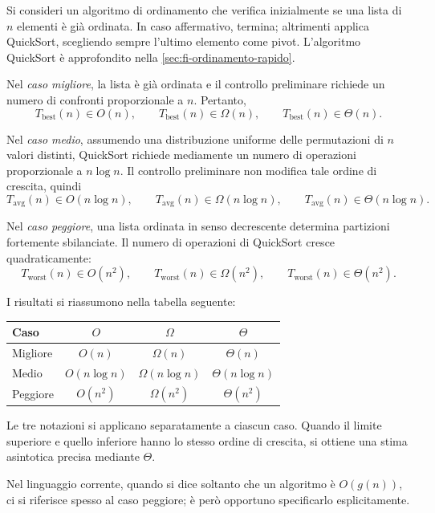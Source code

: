 \begin{example}
Si consideri un algoritmo di ordinamento che verifica inizialmente
se una lista di \(n\) elementi è già ordinata. In caso affermativo,
termina; altrimenti applica QuickSort, scegliendo sempre l'ultimo
elemento come pivot. L'algoritmo QuickSort è approfondito nella
\cref{sec:fi-ordinamento-rapido}.

Nel \emph{caso migliore}, la lista è già ordinata e il controllo
preliminare richiede un numero di confronti proporzionale a \(n\).
Pertanto,
\[
  T_{\mathrm{best}}(n)\in O(n),\qquad
  T_{\mathrm{best}}(n)\in\Omega(n),\qquad
  T_{\mathrm{best}}(n)\in\Theta(n).
\]

Nel \emph{caso medio}, assumendo una distribuzione uniforme delle
permutazioni di \(n\) valori distinti, QuickSort richiede mediamente
un numero di operazioni proporzionale a \(n\log n\). Il controllo
preliminare non modifica tale ordine di crescita, quindi
\[
  T_{\mathrm{avg}}(n)\in O(n\log n),\qquad
  T_{\mathrm{avg}}(n)\in\Omega(n\log n),\qquad
  T_{\mathrm{avg}}(n)\in\Theta(n\log n).
\]

Nel \emph{caso peggiore}, una lista ordinata in senso decrescente
determina partizioni fortemente sbilanciate. Il numero di operazioni
di QuickSort cresce quadraticamente:
\[
  T_{\mathrm{worst}}(n)\in O(n^2),\qquad
  T_{\mathrm{worst}}(n)\in\Omega(n^2),\qquad
  T_{\mathrm{worst}}(n)\in\Theta(n^2).
\]

I risultati si riassumono nella tabella seguente:
\begin{center}
\begin{tabular}{lccc}
  \toprule
  Caso & \(O\) & \(\Omega\) & \(\Theta\)\\
  \midrule
  Migliore & \(O(n)\) & \(\Omega(n)\) & \(\Theta(n)\)\\
  Medio & \(O(n\log n)\) & \(\Omega(n\log n)\)
        & \(\Theta(n\log n)\)\\
  Peggiore & \(O(n^2)\) & \(\Omega(n^2)\) & \(\Theta(n^2)\)\\
  \bottomrule
\end{tabular}
\end{center}

Le tre notazioni si applicano separatamente a ciascun caso.
Quando il limite superiore e quello inferiore hanno lo stesso
ordine di crescita, si ottiene una stima asintotica precisa
mediante \(\Theta\).
\end{example}

Nel linguaggio corrente, quando si dice soltanto che un algoritmo
è \(O(g(n))\), ci si riferisce spesso al caso peggiore; è però opportuno
specificarlo esplicitamente.

